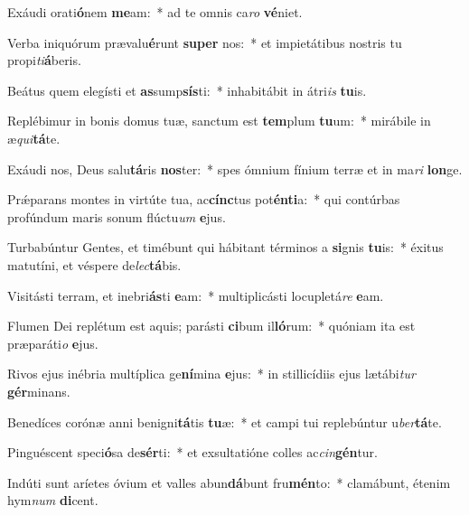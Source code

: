 \item Exáudi orati\textbf{ó}nem \textbf{me}am:~* ad te omnis ca\textit{ro} \textbf{vé}niet.
\item Verba iniquórum prævalu\textbf{é}runt \textbf{su}\textbf{per} nos:~* et impietátibus nostris tu propi\textit{ti}\textbf{á}beris.
\item Beátus quem elegísti et \textbf{as}sump\textbf{sís}ti:~* inhabitábit in átri\textit{is} \textbf{tu}is.
\item Replébimur in bonis domus tuæ, sanctum est \textbf{tem}plum \textbf{tu}um:~* mirábile in æ\textit{qui}\textbf{tá}te.
\item Exáudi nos, Deus salu\textbf{tá}ris \textbf{nos}ter:~* spes ómnium fínium terræ et in ma\textit{ri} \textbf{lon}ge.
\item Prǽparans montes in virtúte tua, ac\textbf{cínc}tus pot\textbf{én}\textbf{ti}a:~* qui contúrbas profúndum maris sonum flúctu\textit{um} \textbf{e}jus.
\item Turbabúntur Gentes, et timébunt qui hábitant términos a \textbf{si}gnis \textbf{tu}is:~* éxitus matutíni, et véspere de\textit{lec}\textbf{tá}bis.
\item Visitásti terram, et inebri\textbf{ás}ti \textbf{e}am:~* multiplicásti locupletá\textit{re} \textbf{e}am.
\item Flumen Dei replétum est aquis; parásti \textbf{ci}bum il\textbf{ló}rum:~* quóniam ita est præparáti\textit{o} \textbf{e}jus.
\item Rivos ejus inébria multíplica ge\textbf{ní}mina \textbf{e}jus:~* in stillicídiis ejus lætábi\textit{tur} \textbf{gér}minans.
\item Benedíces corónæ anni benigni\textbf{tá}tis \textbf{tu}æ:~* et campi tui replebúntur u\textit{ber}\textbf{tá}te.
\item Pinguéscent speci\textbf{ó}sa de\textbf{sér}ti:~* et exsultatióne colles ac\textit{cin}\textbf{gén}tur.
\item Indúti sunt aríetes óvium et valles abun\textbf{dá}bunt fru\textbf{mén}to:~* clamábunt, étenim hym\textit{num} \textbf{di}cent.
